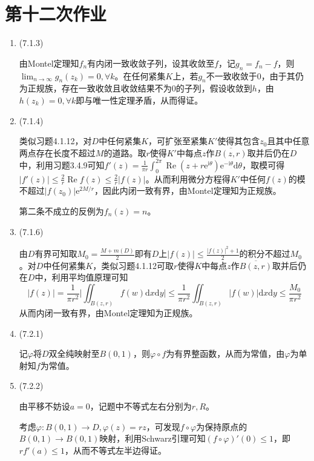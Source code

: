 \documentclass[a4paper,UTF8,fontset=windows]{ctexart}
\DeclareMathOperator{\re}{Re}
\begin{document}
\section{第十二次作业}
\begin{enumerate}
    \item (7.1.3)
    
    由Montel定理知$f_n$有内闭一致收敛子列，设其收敛至$f$，记$g_n=f_n-f$，则$\lim_{n\to\infty}g_n(z_k)=0,\forall k$。在任何紧集$K$上，若$g_n$不一致收敛于0，由于其仍为正规族，存在一致收敛且收敛结果不为0的子列，假设收敛到$h$，由$h(z_k)=0,\forall k$即与唯一性定理矛盾，从而得证。
    
    \item (7.1.4)
    
    类似习题4.1.12，对$D$中任何紧集$K$，可扩张至紧集$K'$使得其包含$z_0$且其中任意两点存在长度不超过$M$的道路。取$r$使得$K'$中每点$z$作$\overline{B(z,r)}$取并后仍在$D$中，利用习题3.4.9可知$f'(z)=\frac{1}{\pi r}\int_0^{2\pi}\re(z+r\mathrm{e}^{\mathrm{i}\theta})\mathrm{e}^{-\mathrm{i}\theta}\mathrm{d}\theta$，取模可得$|f'(z)|\le\frac{2}{r}\re f(z)\le\frac{2}{r}|f(z)|$。从而利用微分方程得$K'$中任何$f(z)$的模不超过$|f(z_0)|\mathrm{e}^{2M/r}$，因此内闭一致有界，由Montel定理知为正规族。
    
    第二条不成立的反例为$f_n(z)=n$。
    
    \item (7.1.6)
    
    由$D$有界可知取$M_0=\frac{M+m(D)}{2}$即有$D$上$|f(z)|\le\frac{|f(z)|^2+1}{2}$的积分不超过$M_0$。对$D$中任何紧集$K$，类似习题4.1.12可取$r$使得$K$中每点$z$作$\overline{B(z,r)}$取并后仍在$D$中，利用平均值原理可知
    \[|f(z)|=\frac{1}{\pi r^2}\bigg|\iint_{B(z,r)}f(w)\mathrm{d}x\mathrm{d}y\bigg|\le\frac{1}{\pi r^2}\iint_{B(z,r)}|f(w)|\mathrm{d}x\mathrm{d}y\le\frac{M_0}{\pi r^2}\]
    从而内闭一致有界，由Montel定理知为正规族。
    
    \item (7.2.1)
    
    记$\varphi$将$D$双全纯映射至$B(0,1)$，则$\varphi\circ f$为有界整函数，从而为常值，由$\varphi$为单射知$f$为常值。
    
    \item (7.2.2)
    
    由平移不妨设$a=0$，记题中不等式左右分别为$r,R$。
    
    考虑$\varphi:B(0,1)\to D,\varphi(z)=rz$，可发现$f\circ\varphi$为保持原点的$B(0,1)\to B(0,1)$映射，利用Schwarz引理可知$(f\circ\varphi)'(0)\le 1$，即$rf'(a)\le1$，从而不等式左半边得证。
    

\end{enumerate}
\end{document}
